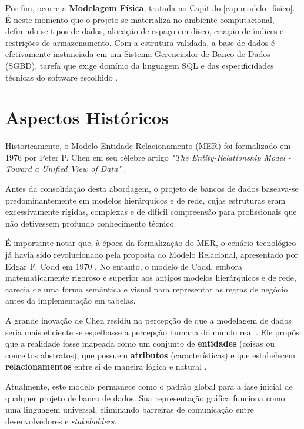 Por fim, ocorre a \textbf{Modelagem Física}, tratada no Capítulo \ref{cap:modelo_fisico}. É neste momento que o projeto se materializa no ambiente computacional, definindo-se tipos de dados, alocação de espaço em disco, criação de índices e restrições de armazenamento. Com a estrutura validada, a base de dados é efetivamente instanciada em um Sistema Gerenciador de Banco de Dados (SGBD), tarefa que exige domínio da linguagem SQL e das especificidades técnicas do software escolhido \cite{angelotti2010banco}.

\section{Aspectos Históricos}

Historicamente, o Modelo Entidade-Relacionamento (MER) foi formalizado em 1976 por Peter P. Chen em seu célebre artigo \textit{"The Entity-Relationship Model - Toward a Unified View of Data"} \cite{peterchen}. 

Antes da consolidação desta abordagem, o projeto de bancos de dados baseava-se predominantemente em modelos hierárquicos e de rede, cujas estruturas eram excessivamente rígidas, complexas e de difícil compreensão para profissionais que não detivessem profundo conhecimento técnico.

É importante notar que, à época da formalização do MER, o cenário tecnológico já havia sido revolucionado pela proposta do Modelo Relacional, apresentado por Edgar F. Codd em 1970 \cite{codd1970relational}. No entanto, o modelo de Codd, embora matematicamente rigoroso e superior aos antigos modelos hierárquicos e de rede, carecia de uma forma semântica e visual para representar as regras de negócio antes da implementação em tabelas.

A grande inovação de Chen residiu na percepção de que a modelagem de dados seria mais eficiente se espelhasse a percepção humana do mundo real \cite{peterchen}. Ele propôs que a realidade fosse mapeada como um conjunto de \textbf{entidades} (coisas ou conceitos abstratos), que possuem \textbf{atributos} (características) e que estabelecem \textbf{relacionamentos} entre si de maneira lógica e natural \cite{peterchen}.

Atualmente, este modelo permanece como o padrão global para a fase inicial de qualquer projeto de banco de dados. Sua representação gráfica funciona como uma linguagem universal, eliminando barreiras de comunicação entre desenvolvedores e \textit{stakeholders}.

